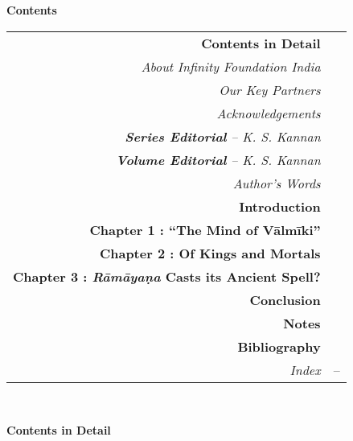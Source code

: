 \thispagestyle{empty}


\hfill{\LARGE\bfseries Contents}
\vskip 20pt

{\renewcommand{\arraystretch}{1.15}
\begin{longtable}[r]{rl@{}}
{{\bf Contents in Detail}} & \pageref{cid}\\[7pt]
{{\sl About Infinity Foundation India}} & \pageref{about}\\[7pt]
{{\sl Our Key Partners}} & \pageref{keypartners}\\[7pt]
{{\sl Acknowledgements}} & \pageref{ack2}\\[7pt]
{{\sl{\bfseries Series Editorial}  – K. S. Kannan}} & \pageref{series_editorial}\\[7pt]
{{\sl{\bfseries Volume Editorial}  – K. S. Kannan}} & \pageref{volume_editorial}\\[7pt]
{{\sl Author's Words}} & \pageref{authors-words}\\[7pt]
{{\bf Introduction}} & \pageref{introduction}\\[7pt]
{{\bfseries Chapter 1 : “The Mind of Vālmīki”}} & \pageref{chapter1}\\[7pt]
{{\bfseries Chapter 2 : Of Kings and Mortals}} & \pageref{chapter2}\\[7pt]
{{\bfseries Chapter 3 : {\sl\bfseries Rāmāyaṇa} Casts its Ancient Spell?}} & \pageref{chapter3}\\[7pt]
{{\bf Conclusion}} & \pageref{conclusion}\\[7pt]
{{\bf Notes}} & \pageref{notes}\\[7pt]
{{\bf Bibliography}} & \pageref{bibliography}\\[7pt]
{{\sl Index}} & \pageref{index}--\pageref{bookend}
\end{longtable}}

\newpage

~\phantom{a}

\vskip 57pt

\thispagestyle{empty}
\hfill{\LARGE\bfseries Contents in Detail}

\vskip 40pt

\label{cid}


